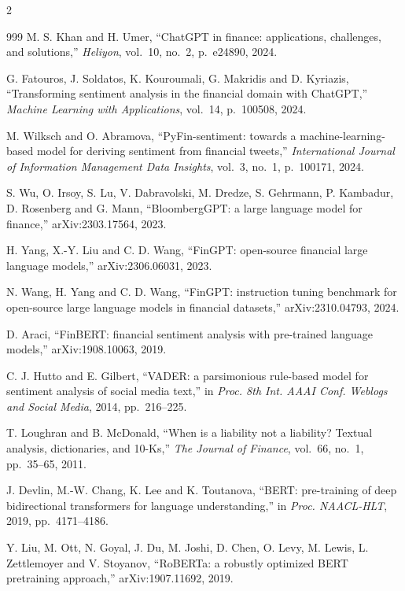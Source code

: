 \begin{footnotesize}
\begin{multicols}{2}
\begin{thebibliography}{999}
 M. S. Khan and H. Umer, ``ChatGPT in finance: applications, challenges,
and solutions,'' \emph{Heliyon}, vol.~10, no.~2, p.~e24890, 2024.

 G. Fatouros, J. Soldatos, K. Kouroumali, G. Makridis and D. Kyriazis,
``Transforming sentiment analysis in the financial domain with ChatGPT,'' \emph{Machine Learning
with Applications}, vol.~14, p.~100508, 2024.

 M. Wilksch and O. Abramova, ``PyFin-sentiment: towards a
machine-learning-based model for deriving sentiment from financial tweets,'' \emph{International
Journal of Information Management Data Insights}, vol.~3, no.~1, p.~100171, 2024.

 S. Wu, O. Irsoy, S. Lu, V. Dabravolski, M. Dredze, S. Gehrmann,
P. Kambadur, D. Rosenberg and G. Mann, ``BloombergGPT: a large language model for finance,''
arXiv:2303.17564, 2023.

 H. Yang, X.-Y. Liu and C. D. Wang, ``FinGPT: open-source financial large
language models,'' arXiv:2306.06031, 2023.

 N. Wang, H. Yang and C. D. Wang, ``FinGPT: instruction tuning
benchmark for open-source large language models in financial datasets,'' arXiv:2310.04793, 2024.

 D. Araci, ``FinBERT: financial sentiment analysis with pre-trained language
models,'' arXiv:1908.10063, 2019.

 C. J. Hutto and E. Gilbert, ``VADER: a parsimonious rule-based model for
sentiment analysis of social media text,'' in \emph{Proc. 8th Int. AAAI Conf. Weblogs and Social
Media}, 2014, pp.~216--225.

 T. Loughran and B. McDonald, ``When is a liability not a liability?
Textual analysis, dictionaries, and 10-Ks,'' \emph{The Journal of Finance}, vol.~66, no.~1,
pp.~35--65, 2011.

 J. Devlin, M.-W. Chang, K. Lee and K. Toutanova, ``BERT: pre-training of
deep bidirectional transformers for language understanding,'' in \emph{Proc. NAACL-HLT}, 2019,
pp.~4171--4186.

 Y. Liu, M. Ott, N. Goyal, J. Du, M. Joshi, D. Chen, O. Levy, M. Lewis,
L. Zettlemoyer and V. Stoyanov, ``RoBERTa: a robustly optimized BERT pretraining approach,''
arXiv:1907.11692, 2019.


\end{thebibliography}
\end{multicols}
\end{footnotesize}
